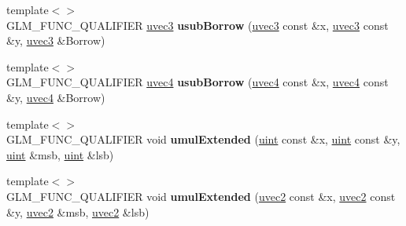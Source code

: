\begin{DoxyCompactItemize}
\item 
\hypertarget{namespaceglm_a3cc22c141f42fb9faf42adb6cb124bb7}{{\footnotesize template$<$$>$ }\\G\-L\-M\-\_\-\-F\-U\-N\-C\-\_\-\-Q\-U\-A\-L\-I\-F\-I\-E\-R \hyperlink{group__core__types_gac4ba593917841b859ba1683b8b52b8fa}{uvec3} {\bfseries usub\-Borrow} (\hyperlink{group__core__types_gac4ba593917841b859ba1683b8b52b8fa}{uvec3} const \&x, \hyperlink{group__core__types_gac4ba593917841b859ba1683b8b52b8fa}{uvec3} const \&y, \hyperlink{group__core__types_gac4ba593917841b859ba1683b8b52b8fa}{uvec3} \&Borrow)}\label{namespaceglm_a3cc22c141f42fb9faf42adb6cb124bb7}

\item 
\hypertarget{namespaceglm_a766d4ebce0a5f042f79787ef32862bb4}{{\footnotesize template$<$$>$ }\\G\-L\-M\-\_\-\-F\-U\-N\-C\-\_\-\-Q\-U\-A\-L\-I\-F\-I\-E\-R \hyperlink{group__core__types_ga1c426d19627b32b14f0089f7f4ba7b1d}{uvec4} {\bfseries usub\-Borrow} (\hyperlink{group__core__types_ga1c426d19627b32b14f0089f7f4ba7b1d}{uvec4} const \&x, \hyperlink{group__core__types_ga1c426d19627b32b14f0089f7f4ba7b1d}{uvec4} const \&y, \hyperlink{group__core__types_ga1c426d19627b32b14f0089f7f4ba7b1d}{uvec4} \&Borrow)}\label{namespaceglm_a766d4ebce0a5f042f79787ef32862bb4}

\item 
\hypertarget{namespaceglm_a656a4eb28952b733f8611d6a5e98472f}{{\footnotesize template$<$$>$ }\\G\-L\-M\-\_\-\-F\-U\-N\-C\-\_\-\-Q\-U\-A\-L\-I\-F\-I\-E\-R void {\bfseries umul\-Extended} (\hyperlink{group__core__precision_ga4fd29415871152bfb5abd588334147c8}{uint} const \&x, \hyperlink{group__core__precision_ga4fd29415871152bfb5abd588334147c8}{uint} const \&y, \hyperlink{group__core__precision_ga4fd29415871152bfb5abd588334147c8}{uint} \&msb, \hyperlink{group__core__precision_ga4fd29415871152bfb5abd588334147c8}{uint} \&lsb)}\label{namespaceglm_a656a4eb28952b733f8611d6a5e98472f}

\item 
\hypertarget{namespaceglm_a0e0e684a25e4d67be3532c7059eb366c}{{\footnotesize template$<$$>$ }\\G\-L\-M\-\_\-\-F\-U\-N\-C\-\_\-\-Q\-U\-A\-L\-I\-F\-I\-E\-R void {\bfseries umul\-Extended} (\hyperlink{group__core__types_gafd2041b45eff671aa8899d2c2835eee9}{uvec2} const \&x, \hyperlink{group__core__types_gafd2041b45eff671aa8899d2c2835eee9}{uvec2} const \&y, \hyperlink{group__core__types_gafd2041b45eff671aa8899d2c2835eee9}{uvec2} \&msb, \hyperlink{group__core__types_gafd2041b45eff671aa8899d2c2835eee9}{uvec2} \&lsb)}\label{namespaceglm_a0e0e684a25e4d67be3532c7059eb366c}


\end{DoxyCompactItemize}
